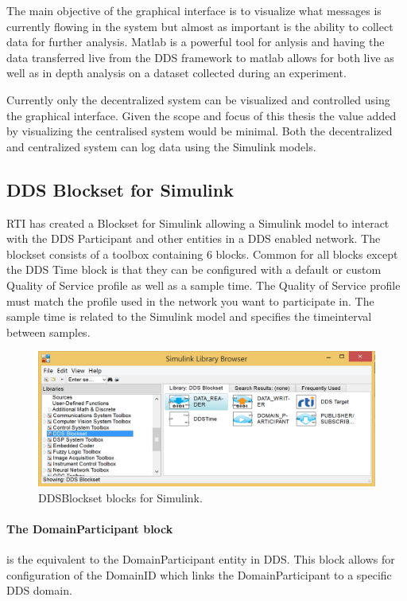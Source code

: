 The main objective of the graphical interface is to visualize what messages is currently flowing in the system but almost as important is the ability to collect data for further analysis.
Matlab is a powerful tool for anlysis and having the data transferred live from the DDS framework to matlab allows for both live as well as in depth analysis on a dataset collected during an experiment.

Currently only the decentralized system can be visualized and controlled using the graphical interface. Given the scope and focus of this thesis the value added by visualizing the centralised system would be minimal. Both the decentralized and centralized system can log data using the Simulink models.

\subsection{DDS Blockset for Simulink}
RTI has created a Blockset for Simulink allowing a Simulink model to interact with the DDS Participant and other entities in a DDS enabled network.
The blockset consists of a toolbox containing 6 blocks. Common for all blocks except the DDS Time block is that they can be configured with a default or custom Quality of Service profile as well as a sample time. The Quality of Service profile must match the profile used in the network you want to participate in. The sample time is related to the Simulink model and specifies the timeinterval between samples.

\begin{figure}[h]
\includegraphics[width=\textwidth]{figures/DDSBlockset}
	\caption[DDSBlockset blocks for Simulink]{
		\label{fig:DDSBlocksetBlocks} 
		\footnotesize{%
			DDSBlockset blocks for Simulink.
		}
	}
\end{figure}


\paragraph{The DomainParticipant block} is the equivalent to the DomainParticipant entity in DDS. This block allows for configuration of the DomainID which links the DomainParticipant to a specific DDS domain.

